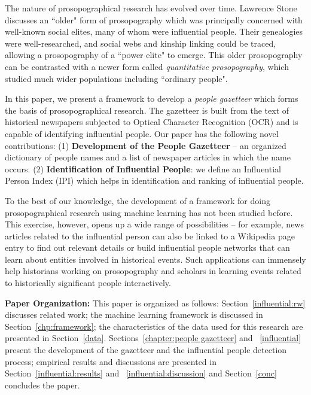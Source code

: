 \documentclass[10pt,journal,compsoc]{IEEEtran}
\begin{document}
The nature of prosopographical research has evolved over time. Lawrence Stone\cite{stone_71} discusses an ``older" form of prosopography which was principally concerned with well-known social elites, many of whom were influential people. Their genealogies were well-researched, and social webs and kinship linking could be traced, allowing a prosopography of a ``power elite" to emerge. This older prosopography can be contrasted with a newer form called \emph{quantitative prosopography}, which studied much wider populations including ``ordinary people". %

In this paper, we present a framework to develop a \textit{people gazetteer} which forms the basis of prosopographical research. The gazetteer is built from the text of historical newspapers subjected to Optical Character Recognition (OCR) and is capable of identifying influential people. Our paper has the following novel contributions: (1) \textbf{Development of the People Gazetteer} -- an organized dictionary of people names and a list of newspaper articles in which the name occurs. (2) \textbf{Identification of Influential People}: we define an Influential Person Index (IPI) which helps in identification and ranking of influential people. 



To the best of our knowledge, the development of a framework for doing prosopographical research using machine learning has not been studied before. This exercise, however, opens up a wide range of possibilities -- for example, news articles related to the influential person can also be linked to a Wikipedia page entry to find out relevant details or build influential people networks that can learn about entities involved in historical events. Such applications can immensely help historians working on prosopography\cite{allen2013toward} and scholars in learning events related to historically significant people interactively.

\noindent \textbf{Paper Organization:} This paper is organized as follows: Section~\ref{influential:rw} discusses related work; the machine learning framework is discussed in Section~\ref{chp:framework}; the characteristics of the data used for this research are presented in Section~\ref{data}. Sections~\ref{chapter:people gazetteer} and ~\ref{influential} present the development of the gazetteer and the influential people detection process; empirical results and discussions are presented in Section~\ref{influential:results} and ~\ref{influential:discussion} and Section~\ref{conc} concludes the paper.
\end{document}
